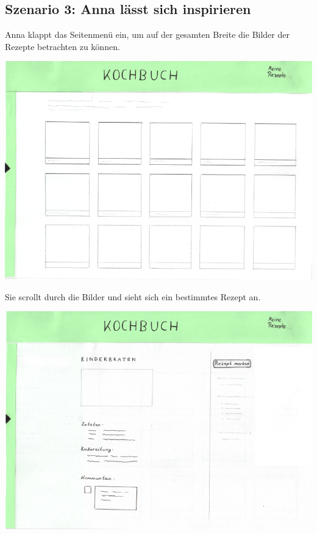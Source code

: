 \documentclass[parskip,10pt,abstracton]{scrartcl}
\begin{document}
\newpage
\subsection*{Szenario 3: Anna lässt sich inspirieren}

Anna klappt das Seitenmenü ein, um auf der gesamten Breite die Bilder der Rezepte betrachten zu können.
\begin{center}
\includegraphics[scale=0.4]{Prototyp/home_menuhidden.png}
\end{center}

Sie scrollt durch die Bilder und sieht sich ein bestimmtes Rezept an.
\begin{center}
\includegraphics[scale=0.4]{Prototyp/rezeptseite_menuhidden.png}
\end{center}
\end{document}
